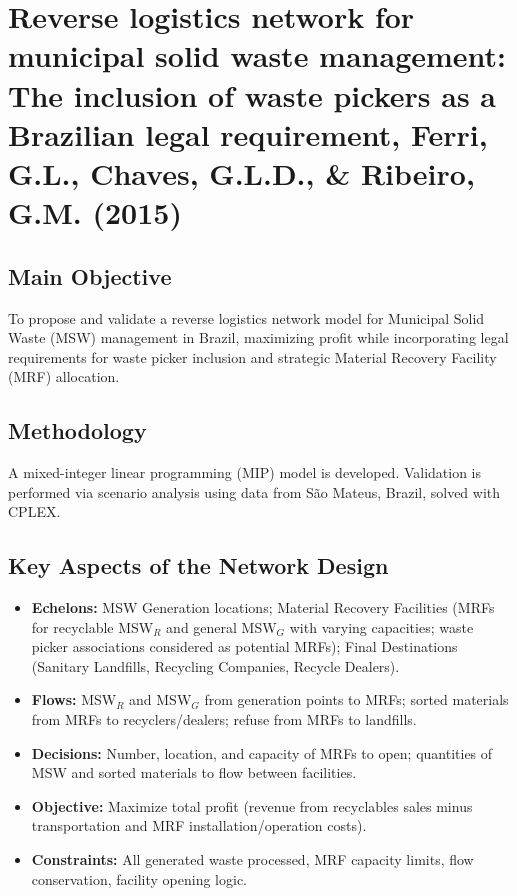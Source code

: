 \section{{Reverse logistics network for municipal solid waste management: The inclusion of waste pickers as a Brazilian legal requirement, Ferri, G.L., Chaves, G.L.D., \& Ribeiro, G.M. (2015)}}

\subsection*{Main Objective}
To propose and validate a reverse logistics network model for Municipal Solid Waste (MSW) management in Brazil, maximizing profit while incorporating legal requirements for waste picker inclusion and strategic Material Recovery Facility (MRF) allocation.

\subsection*{Methodology}
A mixed-integer linear programming (MIP) model is developed. Validation is performed via scenario analysis using data from São Mateus, Brazil, solved with CPLEX.

\subsection*{Key Aspects of the Network Design}
\begin{itemize}
    \item \textbf{Echelons:} MSW Generation locations; Material Recovery Facilities (MRFs for recyclable MSW$_{R}$ and general MSW$_{G}$ with varying capacities; waste picker associations considered as potential MRFs); Final Destinations (Sanitary Landfills, Recycling Companies, Recycle Dealers).
    \item \textbf{Flows:} MSW$_{R}$ and MSW$_{G}$ from generation points to MRFs; sorted materials from MRFs to recyclers/dealers; refuse from MRFs to landfills.
    \item \textbf{Decisions:} Number, location, and capacity of MRFs to open; quantities of MSW and sorted materials to flow between facilities.
    \item \textbf{Objective:} Maximize total profit (revenue from recyclables sales minus transportation and MRF installation/operation costs).
    \item \textbf{Constraints:} All generated waste processed, MRF capacity limits, flow conservation, facility opening logic.
\end{itemize}

